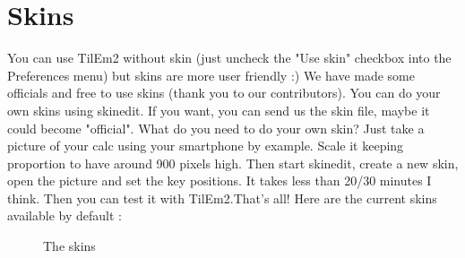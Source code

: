 \documentclass[10pt]{report}
\begin{document}
\section{Skins}
You can use TilEm2 without skin (just uncheck the "Use skin" checkbox into the Preferences menu) but skins are more user friendly :)\newline
We have made some officials and free to use skins (thank you to our contributors).\newline
You can do your own skins using skinedit. If you want, you can send us the skin file, maybe it could become "official".\newline\newline
What do you need to do your own skin?\newline
Just take a picture of your calc using your smartphone by example.\newline
Scale it keeping proportion to have around 900 pixels high.\newline
Then start skinedit, create a new skin, open the picture and set the key positions.\newline
It takes less than 20/30 minutes I think.\newline
Then you can test it with TilEm2.That's all!\newline
Here are the current skins available by default :\newline
\begin{figure}[H]
\centering
{}
\caption{The skins}
\end{figure}
\end{document}
